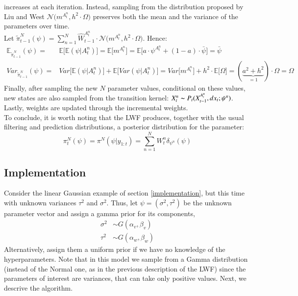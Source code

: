 \documentclass[
]{book}
\theoremstyle{break}
\theoremstyle{nonumberplain}
\begin{document}
increases at each iteration. Instead, sampling from the distribution
proposed by Liu and West
\(\mathcal N\big(m^{A_t^n},h^2\cdot \Omega\big)\) preserves both the
mean and the variance of the parameters over time.\\
Let
\(\tilde \pi_{t-1}^N(\psi)=\sum_{n=1}^N \hat W_{t-1}^{A_t^{n}}\cdot \mathcal N\big(m^{A_t^n},h^2\cdot \Omega\big)\).
Hence: \begin{equation*}
    \begin{split}
        \mathbb E_{\tilde \pi_{t-1}^N} ( \psi)=& \mathbb E\big[\mathbb E( \psi|A_t^{n})\big]=\mathbb E\big[m^{A_t^n}\big]=\mathbb E\big[a\cdot \psi^{A_t^n}+(1-a)\cdot \bar \psi\big]=\bar \psi\\
        Var_{\tilde \pi_{t-1}^N} ( \psi)=&Var\big[\mathbb E( \psi|A_t^{n})\big]+\mathbb E\big[Var( \psi|A_t^{n})\big]=Var\big[m^{A_t^n}\big]+h^2\cdot\mathbb E\big[\Omega\big]=(\underbrace{a^2+h^2}_{=1})\cdot \Omega =\Omega
    \end{split}
\end{equation*} Finally, after sampling the new \(N\) parameter values,
conditional on these values, new states are also sampled from the
transition kernel: \(X_t^n\thicksim P_t(X_{t-1}^{A_t^n},dx_t; \psi^n)\).
Lastly, weights are updated through the incremental weights.~\\
To conclude, it is worth noting that the LWF produces, together with the
usual filtering and prediction distributions, a posterior distribution
for the parameter: \begin{equation}
    \pi^N_{t}(\psi)=\pi^N(\psi|y_{1:t})=\sum_{n=1}^NW_{t}^n\delta_{\psi^n}(\psi)
\end{equation}

\subsection{Implementation}

Consider the linear Gaussian example of section \ref{implementation},
but this time with unknown variances \(\tau^{2}\) and \(\sigma^{2}\).
Thus, let \(\psi=(\sigma^{2},\tau^{2})\) be the unknown parameter vector
and assign a gamma prior for its components, \begin{align*}
\sigma^{2}  & \sim G(\alpha_{v},\beta_{v}) \\
\tau^{2}  & \sim G(\alpha_{w},\beta_{w})
\end{align*} Alternatively, assign them a uniform prior if we have no
knowledge of the hyperparameters. Note that in this model we sample from
a Gamma distribution (instead of the Normal one, as in the previous
description of the LWF) since the parameters of interest are variances,
that can take only positive values. Next, we descrive the algorithm.
\end{document}
